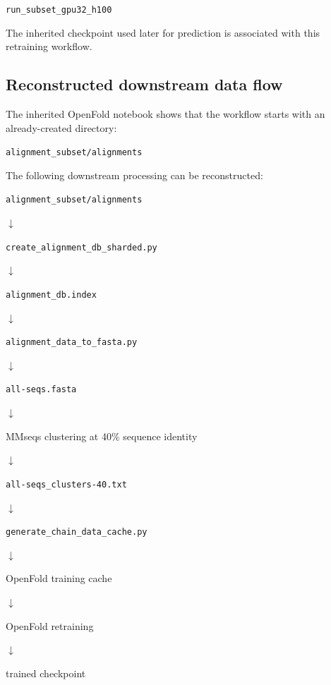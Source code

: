 \documentclass[11pt,a4paper]{article}
\begin{document}
\begin{center}
\texttt{run\_subset\_gpu32\_h100}
\end{center}

The inherited checkpoint used later for prediction is associated with this retraining workflow.


\subsection{Reconstructed downstream data flow}

The inherited OpenFold notebook shows that the workflow starts with an already-created directory:

\begin{center}
\texttt{alignment\_subset/alignments}
\end{center}

The following downstream processing can be reconstructed:

\begin{center}
\begin{minipage}{0.85\textwidth}
\centering

\texttt{alignment\_subset/alignments}

$\downarrow$

\texttt{create\_alignment\_db\_sharded.py}

$\downarrow$

\texttt{alignment\_db.index}

$\downarrow$

\texttt{alignment\_data\_to\_fasta.py}

$\downarrow$

\texttt{all-seqs.fasta}

$\downarrow$

MMseqs clustering at 40\% sequence identity

$\downarrow$

\texttt{all-seqs\_clusters-40.txt}

$\downarrow$

\texttt{generate\_chain\_data\_cache.py}

$\downarrow$

OpenFold training cache

$\downarrow$

OpenFold retraining

$\downarrow$

trained checkpoint

\end{minipage}
\end{center}
\end{document}
